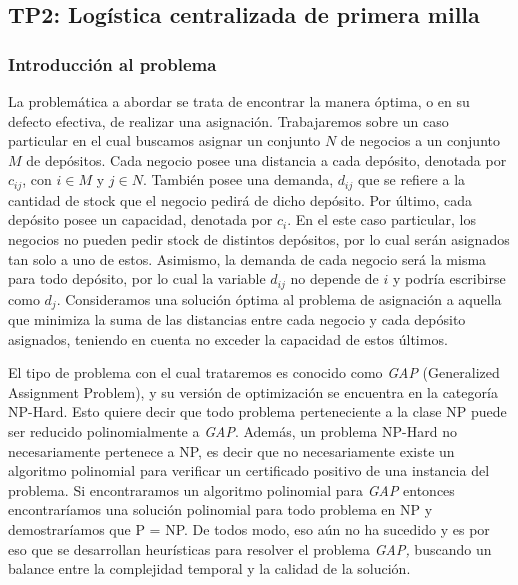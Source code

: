 \documentclass[
]{article}
\author{}
\date{\vspace{-2.5em}}
\begin{document}
\hypertarget{tp2-loguxedstica-centralizada-de-primera-milla}{%
\subsection{TP2: Logística centralizada de primera
milla}\label{tp2-loguxedstica-centralizada-de-primera-milla}}

\hypertarget{introducciuxf3n-al-problema}{%
\subsubsection{Introducción al
problema}\label{introducciuxf3n-al-problema}}

La problemática a abordar se trata de encontrar la manera óptima, o en
su defecto efectiva, de realizar una asignación. Trabajaremos sobre un
caso particular en el cual buscamos asignar un conjunto \(N\) de
negocios a un conjunto \(M\) de depósitos. Cada negocio posee una
distancia a cada depósito, denotada por \(c_{ij}\), con \(i\in{M}\) y
\(j \in{N}\). También posee una demanda, \(d_{ij}\) que se refiere a la
cantidad de stock que el negocio pedirá de dicho depósito. Por último,
cada depósito posee un capacidad, denotada por \(c_i\). En el este caso
particular, los negocios no pueden pedir stock de distintos depósitos,
por lo cual serán asignados tan solo a uno de estos. Asimismo, la
demanda de cada negocio será la misma para todo depósito, por lo cual la
variable \(d_{ij}\) no depende de \(i\) y podría escribirse como
\(d_j\). Consideramos una solución óptima al problema de asignación a
aquella que minimiza la suma de las distancias entre cada negocio y cada
depósito asignados, teniendo en cuenta no exceder la capacidad de estos
últimos.

El tipo de problema con el cual trataremos es conocido como \emph{GAP}
(Generalized Assignment Problem), y su versión de optimización se
encuentra en la categoría NP-Hard. Esto quiere decir que todo problema
perteneciente a la clase NP puede ser reducido polinomialmente a
\emph{GAP}. Además, un problema NP-Hard no necesariamente pertenece a
NP, es decir que no necesariamente existe un algoritmo polinomial para
verificar un certificado positivo de una instancia del problema. Si
encontraramos un algoritmo polinomial para \emph{GAP} entonces
encontraríamos una solución polinomial para todo problema en NP y
demostraríamos que P = NP. De todos modo, eso aún no ha sucedido y es
por eso que se desarrollan heurísticas para resolver el problema
\emph{GAP,} buscando un balance entre la complejidad temporal y la
calidad de la solución.
\end{document}
